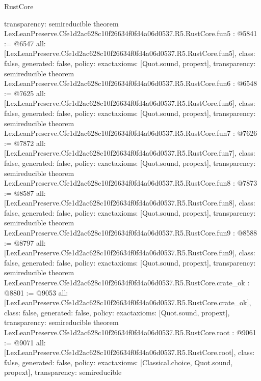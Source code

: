 \begin{lexlean}{RustCore}
\begin{coremodule}
{  transparency: semireducible
}
theorem LexLeanPreserve.Cfe1d2ac628c10f26634f0fd4a06d0537.R5.RustCore.fun5 : @5841 := @6547 {
  all: [LexLeanPreserve.Cfe1d2ac628c10f26634f0fd4a06d0537.R5.RustCore.fun5],
  class: false,
  generated: false,
  policy: exact{axioms: [Quot.sound, propext]},
  transparency: semireducible
}
theorem LexLeanPreserve.Cfe1d2ac628c10f26634f0fd4a06d0537.R5.RustCore.fun6 : @6548 := @7625 {
  all: [LexLeanPreserve.Cfe1d2ac628c10f26634f0fd4a06d0537.R5.RustCore.fun6],
  class: false,
  generated: false,
  policy: exact{axioms: [Quot.sound, propext]},
  transparency: semireducible
}
theorem LexLeanPreserve.Cfe1d2ac628c10f26634f0fd4a06d0537.R5.RustCore.fun7 : @7626 := @7872 {
  all: [LexLeanPreserve.Cfe1d2ac628c10f26634f0fd4a06d0537.R5.RustCore.fun7],
  class: false,
  generated: false,
  policy: exact{axioms: [Quot.sound, propext]},
  transparency: semireducible
}
theorem LexLeanPreserve.Cfe1d2ac628c10f26634f0fd4a06d0537.R5.RustCore.fun8 : @7873 := @8587 {
  all: [LexLeanPreserve.Cfe1d2ac628c10f26634f0fd4a06d0537.R5.RustCore.fun8],
  class: false,
  generated: false,
  policy: exact{axioms: [Quot.sound, propext]},
  transparency: semireducible
}
theorem LexLeanPreserve.Cfe1d2ac628c10f26634f0fd4a06d0537.R5.RustCore.fun9 : @8588 := @8797 {
  all: [LexLeanPreserve.Cfe1d2ac628c10f26634f0fd4a06d0537.R5.RustCore.fun9],
  class: false,
  generated: false,
  policy: exact{axioms: [Quot.sound, propext]},
  transparency: semireducible
}
theorem LexLeanPreserve.Cfe1d2ac628c10f26634f0fd4a06d0537.R5.RustCore.crate_ok : @8801 := @9053 {
  all: [LexLeanPreserve.Cfe1d2ac628c10f26634f0fd4a06d0537.R5.RustCore.crate_ok],
  class: false,
  generated: false,
  policy: exact{axioms: [Quot.sound, propext]},
  transparency: semireducible
}
theorem LexLeanPreserve.Cfe1d2ac628c10f26634f0fd4a06d0537.R5.RustCore.root : @9061 := @9071 {
  all: [LexLeanPreserve.Cfe1d2ac628c10f26634f0fd4a06d0537.R5.RustCore.root],
  class: false,
  generated: false,
  policy: exact{axioms: [Classical.choice, Quot.sound, propext]},
  transparency: semireducible
}


\end{coremodule}
\end{lexlean}
